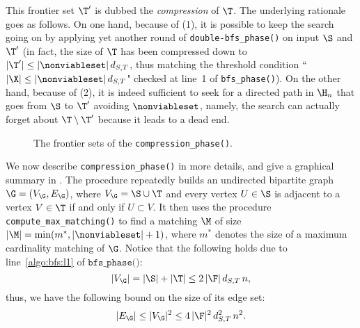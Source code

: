 This frontier set $\T'$ is dubbed the \emph{compression} of $\T$. The underlying rationale goes as follows.
On one hand, because of (1), it is possible to keep the search going on by applying yet another round of \texttt{double-bfs\_phase()} on input $\S$ and $\T'$
(in fact, the size of $\T$ has been compressed down to $|\T'|\leq |\nonviableset|\, d_{S,T}$,
thus matching the threshold condition ``$|\X|\leq |\nonviableset|\, d_{S,T}$" checked at line~1 of \texttt{bfs\_phase()}).
On the other hand, because of (2), it is indeed sufficient to seek for a directed path in $\H_n$ that goes from $\S$ to $\T'$ avoiding $\nonviableset$,
namely, the search can actually forget about $\T\setminus \T'$ because it leads to a dead end.
\begin{figure}[!htb]
    \centering
    \caption{The frontier sets of the \texttt{compression\_phase()}.}
\label{fig:compression_phase}
\end{figure}
We now describe \texttt{compression\_phase()} in more details,
and give a graphical summary in .
The procedure repeatedly builds an undirected bipartite graph
$\G=(V_\G, E_\G)$,
where $V_\G=\S\cup\T$ and
every vertex
$U\in\S$ is adjacent to a vertex $V\in\T$
if and only if $U\subset V$.
It then uses the procedure \texttt{compute\_max\_matching()} to find a matching
$\M$ of size $|\M|=\min(m^*, |\nonviableset|+1)$,
  where $m^*$ denotes the size of a maximum cardinality matching of $\G$.
Notice that the following holds due to line~\ref{algo:bfs:l1} of $\texttt{bfs\_phase()}$:
\[|V_\G| = |\S| + |\T| \leq 2\,|\F|\, d_{S,T}\, n,\]
thus, we have the following bound on the size of its edge set:
\[|E_\G| \leq |V_\G|^2 \leq 4\,|\F|^2\, d^2_{S,T}\, n^2. \]

